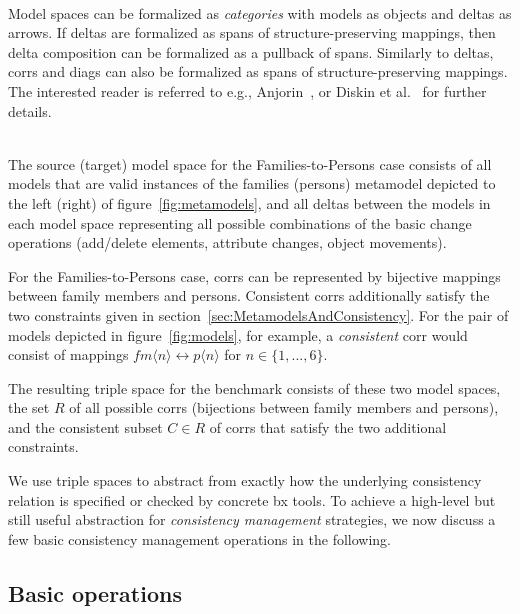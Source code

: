 \begin{remark}[Formalization]~\\
Model spaces can be formalized as \emph{categories} with models as objects and deltas as arrows.
If deltas are formalized as spans of structure-preserving mappings, then delta composition can be formalized as a pullback of spans.
Similarly to deltas, corrs and diags can also be formalized as spans of structure-preserving mappings.
The interested reader is referred to e.g., Anjorin~\cite{DBLP:conf/ac/Anjorin16}, or Diskin et al.~\cite{JOT:issue_2011_01/article6} for further details.
\end{remark}

\begin{example}~\\
The source (target) model space for the Families-to-Persons case consists of all models that are valid instances of the families (persons) metamodel depicted to the left (right) of figure~\ref{fig:metamodels}, and all deltas between the models in each model space representing all possible combinations of the basic change operations (add/delete elements, attribute changes, object movements).

For the Families-to-Persons case, corrs can be represented by bijective mappings between family members and persons.
Consistent corrs additionally satisfy the two constraints given in section~\ref{sec:MetamodelsAndConsistency}.  
For the pair of models depicted in figure~\ref{fig:models}, for example, a \emph{consistent} corr would consist of mappings $fm\langle n \rangle \leftrightarrow p\langle n \rangle$ for $n \in \{1, ..., 6 \}$.

The resulting triple space for the benchmark consists of these two model spaces, the set $R$ of all possible corrs (bijections between family members and persons), and the consistent subset $C \in R$ of corrs that satisfy the two additional constraints. 
\end{example}

We use triple spaces to abstract from exactly how the underlying consistency relation is specified or checked by concrete bx tools.
To achieve a high-level but still useful abstraction for \emph{consistency management} strategies, we now discuss a few basic consistency management operations in the following. 


\subsection{Basic operations}
\label{sec:basicOperations}

